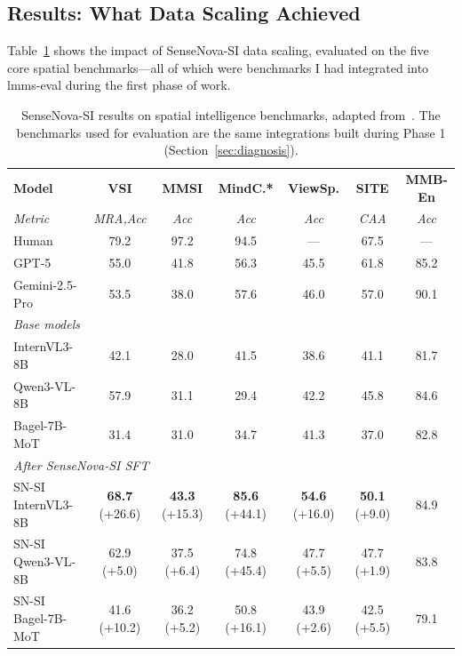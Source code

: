 \documentclass[
hf,
]{confart}
\begin{document}
\subsection{Results: What Data Scaling Achieved}

Table~\ref{tab:scaling_results} shows the impact of SenseNova-SI data scaling, evaluated on the five core spatial benchmarks---all of which were benchmarks I had integrated into lmms-eval during the first phase of work.

\begin{table}[htbp]
\centering
\caption{SenseNova-SI results on spatial intelligence benchmarks, adapted from~\cite{cai2025scalingspatialintelligencemultimodal}. The benchmarks used for evaluation are the same integrations built during Phase 1 (Section~\ref{sec:diagnosis}).}
\label{tab:scaling_results}
\renewcommand{\arraystretch}{1.1}
\footnotesize
\setlength{\tabcolsep}{4pt}
\begin{tabular}{lcccccc}
\toprule
\textbf{Model} & \textbf{VSI} & \textbf{MMSI} & \textbf{MindC.*} & \textbf{ViewSp.} & \textbf{SITE} & \textbf{MMB-En} \\
\textit{Metric} & \textit{MRA,Acc} & \textit{Acc} & \textit{Acc} & \textit{Acc} & \textit{CAA} & \textit{Acc} \\
\midrule
Human & 79.2 & 97.2 & 94.5 & --- & 67.5 & --- \\
GPT-5 & 55.0 & 41.8 & 56.3 & 45.5 & 61.8 & 85.2 \\
Gemini-2.5-Pro & 53.5 & 38.0 & 57.6 & 46.0 & 57.0 & 90.1 \\
\midrule
\multicolumn{7}{l}{\textit{Base models}} \\
InternVL3-8B & 42.1 & 28.0 & 41.5 & 38.6 & 41.1 & 81.7 \\
Qwen3-VL-8B & 57.9 & 31.1 & 29.4 & 42.2 & 45.8 & 84.6 \\
Bagel-7B-MoT & 31.4 & 31.0 & 34.7 & 41.3 & 37.0 & 82.8 \\
\midrule
\multicolumn{7}{l}{\textit{After SenseNova-SI SFT}} \\
SN-SI InternVL3-8B & \textbf{68.7} (+26.6) & \textbf{43.3} (+15.3) & \textbf{85.6} (+44.1) & \textbf{54.6} (+16.0) & \textbf{50.1} (+9.0) & 84.9 \\
SN-SI Qwen3-VL-8B & 62.9 (+5.0) & 37.5 (+6.4) & 74.8 (+45.4) & 47.7 (+5.5) & 47.7 (+1.9) & 83.8 \\
SN-SI Bagel-7B-MoT & 41.6 (+10.2) & 36.2 (+5.2) & 50.8 (+16.1) & 43.9 (+2.6) & 42.5 (+5.5) & 79.1 \\
\bottomrule
\end{tabular}
\end{table}
\end{document}
